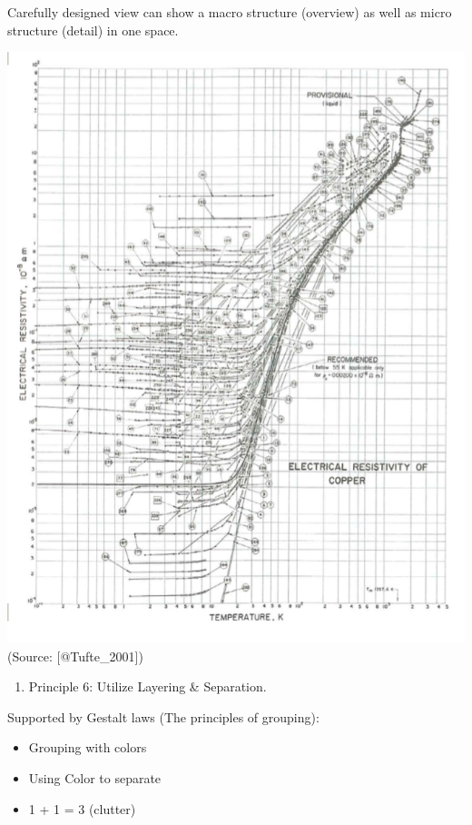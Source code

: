 \documentclass[]{book}
\providecommand{\tightlist}{%
  \setlength{\itemsep}{0pt}\setlength{\parskip}{0pt}}
\theoremstyle{definition}
\theoremstyle{definition}
\theoremstyle{definition}
\theoremstyle{remark}
\begin{document}
Carefully designed view can show a macro structure (overview) as well as
micro structure (detail) in one space.

\includegraphics{images/Tufte_figure9.png} (Source: {[}@Tufte\_2001{]})

\begin{enumerate}
\def\labelenumi{\arabic{enumi}.}
\setcounter{enumi}{5}
\tightlist
\item
  Principle 6: Utilize Layering \& Separation.
\end{enumerate}

Supported by Gestalt laws (The principles of grouping):

\begin{itemize}
\tightlist
\item
  Grouping with colors
\item
  Using Color to separate
\item
  1 + 1 = 3 (clutter)
\end{itemize}
\end{document}
